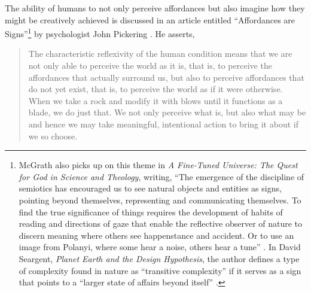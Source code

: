 The ability of humans to not only perceive affordances but also imagine
how they might be creatively achieved is discussed in an article
entitled ``Affordances are Signs''\footnote{
McGrath also picks up on this
theme in \textit{A Fine-Tuned Universe: The Quest
for God in Science and Theology}, writing, ``The emergence of the discipline of semiotics
has encouraged us to see natural objects and entities as signs,
pointing beyond themselves, representing and communicating themselves.
To find the true significance of things requires the development of
habits of reading and directions of gaze that enable the reflective
observer of nature to discern meaning where others see happenstance and
accident. Or to use an image from Polanyi, where some hear a noise,
others hear a tune” \citep[][p.~3]{mcgrath2009}. In David Seargent, \textit{Planet Earth and the
Design Hypothesis}, the author defines a
type of complexity found in nature as “transitive complexity” if it
serves as a sign that points to a “larger state of affairs beyond
itself” \citep{seargent2007}.
} by psychologist
John Pickering \citep{pickering2007}. He asserts, 

\begin{quote}
The characteristic reflexivity of the
human condition means that we are not only able to perceive the world
as it is, that is, to perceive the affordances that actually surround
us, but also to perceive affordances that do not yet exist, that is, to
perceive the world as if it were otherwise. When we take a rock and
modify it with blows until it functions as a blade, we do just that. We
not only perceive what is, but also what may be and hence we may take
meaningful, intentional action to bring it about if we so choose. \citep{pickering2007}
\end{quote}

